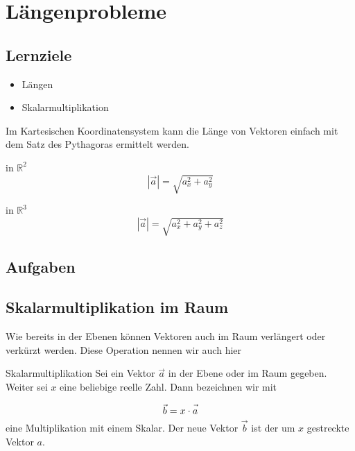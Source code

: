 \section{Längenprobleme}

\subsection*{Lernziele}
\begin{itemize}
\item Längen
\item Skalarmultiplikation
\end{itemize}

Im Kartesischen Koordinatensystem kann die Länge von Vektoren einfach
mit dem Satz des Pythagoras ermittelt werden.

\begin{gesetz}{in $\mathbb{R}^2$}{}
  $$|\vec{a}| = \sqrt{a_x^2 + a_y^2}$$
\end{gesetz}

\begin{gesetz}{in $\mathbb{R}^3$}{}
  $$|\vec{a}| = \sqrt{a_x^2 + a_y^2 + a_z^2}$$
\end{gesetz}


\subsection*{Aufgaben}

\newpage


\subsection{Skalarmultiplikation im Raum}
Wie bereits in der Ebenen können Vektoren auch im Raum verlängert oder
verkürzt werden. Diese Operation nennen wir auch hier 

\begin{definition}{Skalarmultiplikation}{}
  Sei ein Vektor $\vec{a}$ in der Ebene oder im Raum gegeben. Weiter
  sei $x$ eine beliebige reelle Zahl. Dann bezeichnen wir mit
  
  $$\vec{b} = x \cdot{} \vec{\vphantom{b}a}$$
  eine Multiplikation mit einem Skalar. Der neue Vektor $\vec{b}$ ist
  der um $x$ gestreckte Vektor $a$. 
\end{definition}


